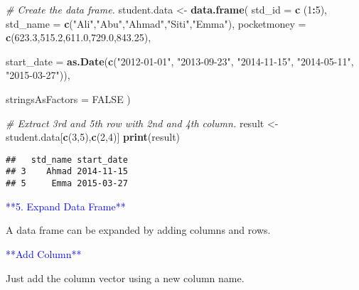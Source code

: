 \documentclass[
]{article}
\newenvironment{Shaded}{\begin{snugshade}}{\end{snugshade}}
\newcommand{\AttributeTok}[1]{\textcolor[rgb]{0.13,0.29,0.53}{#1}}
\newcommand{\CommentTok}[1]{\textcolor[rgb]{0.56,0.35,0.01}{\textit{#1}}}
\newcommand{\ConstantTok}[1]{\textcolor[rgb]{0.56,0.35,0.01}{#1}}
\newcommand{\DecValTok}[1]{\textcolor[rgb]{0.00,0.00,0.81}{#1}}
\newcommand{\FloatTok}[1]{\textcolor[rgb]{0.00,0.00,0.81}{#1}}
\newcommand{\FunctionTok}[1]{\textcolor[rgb]{0.13,0.29,0.53}{\textbf{#1}}}
\newcommand{\NormalTok}[1]{#1}
\newcommand{\OtherTok}[1]{\textcolor[rgb]{0.56,0.35,0.01}{#1}}
\newcommand{\SpecialCharTok}[1]{\textcolor[rgb]{0.81,0.36,0.00}{\textbf{#1}}}
\newcommand{\StringTok}[1]{\textcolor[rgb]{0.31,0.60,0.02}{#1}}
\begin{document}
\begin{Shaded}
\begin{Highlighting}[]
\CommentTok{\# Create the data frame.}
\NormalTok{student.data }\OtherTok{\textless{}{-}} \FunctionTok{data.frame}\NormalTok{(}
   \AttributeTok{std\_id =} \FunctionTok{c}\NormalTok{ (}\DecValTok{1}\SpecialCharTok{:}\DecValTok{5}\NormalTok{), }
   \AttributeTok{std\_name =} \FunctionTok{c}\NormalTok{(}\StringTok{"Ali"}\NormalTok{,}\StringTok{"Abu"}\NormalTok{,}\StringTok{"Ahmad"}\NormalTok{,}\StringTok{"Siti"}\NormalTok{,}\StringTok{"Emma"}\NormalTok{),}
   \AttributeTok{pocketmoney =} \FunctionTok{c}\NormalTok{(}\FloatTok{623.3}\NormalTok{,}\FloatTok{515.2}\NormalTok{,}\FloatTok{611.0}\NormalTok{,}\FloatTok{729.0}\NormalTok{,}\FloatTok{843.25}\NormalTok{), }
   
   \AttributeTok{start\_date =} \FunctionTok{as.Date}\NormalTok{(}\FunctionTok{c}\NormalTok{(}\StringTok{"2012{-}01{-}01"}\NormalTok{, }\StringTok{"2013{-}09{-}23"}\NormalTok{, }\StringTok{"2014{-}11{-}15"}\NormalTok{, }\StringTok{"2014{-}05{-}11"}\NormalTok{,}
      \StringTok{"2015{-}03{-}27"}\NormalTok{)),}
 
   \AttributeTok{stringsAsFactors =} \ConstantTok{FALSE}
\NormalTok{)}

\CommentTok{\# Extract 3rd and 5th row with 2nd and 4th column.}
\NormalTok{result }\OtherTok{\textless{}{-}}\NormalTok{ student.data[}\FunctionTok{c}\NormalTok{(}\DecValTok{3}\NormalTok{,}\DecValTok{5}\NormalTok{),}\FunctionTok{c}\NormalTok{(}\DecValTok{2}\NormalTok{,}\DecValTok{4}\NormalTok{)]}
\FunctionTok{print}\NormalTok{(result)}
\end{Highlighting}
\end{Shaded}

\begin{verbatim}
##   std_name start_date
## 3    Ahmad 2014-11-15
## 5     Emma 2015-03-27
\end{verbatim}

\textcolor{blue}{**5. Expand Data Frame**}

A data frame can be expanded by adding columns and rows.

\textcolor{blue}{**Add Column**}

Just add the column vector using a new column name.
\end{document}
